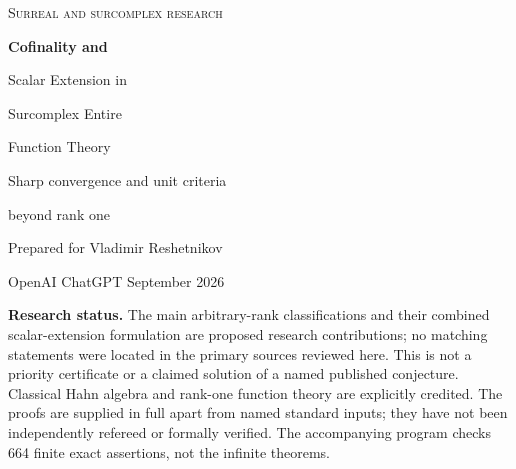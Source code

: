 \documentclass[11pt,letterpaper]{article}
\numberwithin{equation}{section}
\theoremstyle{definition}
\theoremstyle{remark}
\newcommand{\No}{\mathbf{No}}
\newcommand{\C}{\mathbb C}
\begin{document}
\hypersetup{pageanchor=false}
\begin{titlepage}
\vspace*{5mm}
{\color{Accent}\large\scshape Surreal and surcomplex research\par}
\vspace{10mm}
{\color{Ink}\Huge\bfseries Cofinality and\par Scalar Extension in\par Surcomplex Entire\par Function Theory\par}
\vspace{6mm}
{\Large Sharp convergence and unit criteria\par beyond rank one\par}
\vspace{9mm}
{\large Prepared for Vladimir Reshetnikov\par}
{\large OpenAI ChatGPT\quad\textbullet{} September 2026\par}
\vspace{8mm}
\begin{abstract}
Let $K_\Gamma=\C((t^\Gamma))$ be a Hahn field with a nonzero divisible ordered
abelian value group, canonically viewed as a surcomplex workspace when
$\Gamma\subset\No$. We study ordinary power series whose evaluations are
strongly Hahn-summable at every point of this field. We prove that this
apparently support-theoretic condition is equivalent to
$v(a_n)/n\to+\infty$ in the whole ordered group. Consequently nonpolynomial
entire series exist exactly when $\Gamma$ has countable cofinality.

A different invariant governs local inversion: a nonconstant valuation-restricted
series is a unit precisely when its constant coefficient strictly dominates
and the least positive valuation gap is an order unit of $\Gamma$.
For every ordered-group extension $\Gamma\subset\Delta$, we then determine
the exact common strong evaluation domain of all nonpolynomial entire series
over $K_\Gamma$. It is the valuation ring associated with the convex hull of
$\Gamma$ in $\Delta$. Entireness survives exactly for cofinal extensions,
and no new zeros appear anywhere in that domain. Support-controlled
preparation supplies the necessary arbitrary-rank root theory and a genus-zero
factorization theorem. Explicit infinite-rank surreal examples separate
countable cofinality, topological nilpotence, strong summation, and extension
to all surcomplex numbers.
\end{abstract}
\vfill
\begin{scopebox}\small
\textbf{Research status.} The main arbitrary-rank classifications and their
combined scalar-extension formulation are proposed research contributions;
no matching statements were located in the primary sources reviewed here.
This is not a priority certificate or a claimed solution of a named published
conjecture. Classical Hahn algebra and rank-one function theory are explicitly
credited. The proofs are supplied in full apart from named standard inputs;
they have not been independently refereed or formally verified. The accompanying
program checks 664 finite exact assertions, not the infinite theorems.
\end{scopebox}
\end{titlepage}
\end{document}
